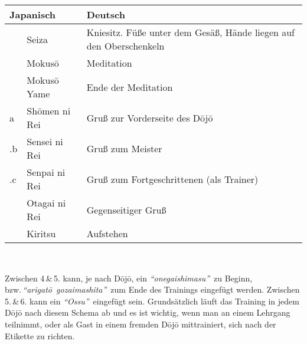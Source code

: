 \setcounter{num}{0}
\setcounter{numz}{0}
\begin{tcolorbox}[colframe=lightgray,colback=white,coltitle=black,title=Allgemeines:\indent Trainingsablauf Begrüßung und Ende]
	\null\vfill\null	
	\begin{tabularx}{\textwidth}{llX}
		\multicolumn{2}{l}{\textbf{Japanisch}} 	& \textbf{Deutsch}\\
		\midrule
		\ctu		& Seiza 				& Kniesitz. Füße unter dem Gesäß, Hände liegen auf den Oberschenkeln\\
		\ctu		& Mokus\={o}			& Meditation\\
		\ctu		& Mokus\={o} Yame		& Ende der Meditation\\
		\ctu a		& Sh\={o}men ni Rei		& Gruß zur Vorderseite des D\={o}j\={o}\\
		\thenum .b	& Sensei ni Rei			& Gruß zum Meister\\
		\thenum .c	& Senpai ni Rei			& Gruß zum Fortgeschrittenen (als Trainer)\\
		\ctu		& Otagai ni Rei			& Gegenseitiger Gruß\\
		\ctu		& Kiritsu				& Aufstehen\\		
		\midrule
	\end{tabularx}\\\null\vfill\null
	\begin{center}
		\parbox{\textwidth-2\tabcolsep}{Zwischen 4\,\&\,5. kann, je nach D\={o}j\={o}, ein \textit{\textquotedblleft onegaishimasu\textquotedblright}~zu Beginn, bzw.\,\textit{\mbox{\textquotedblleft arigat\={o} gozaimashita\textquotedblright}}~zum Ende des Trainings eingefügt werden. Zwischen 5.\,\&\,6. kann ein \textit{\textquotedblleft Ossu\textquotedblright}~eingefügt sein. Grundsätzlich läuft das Training in jedem D\={o}j\={o} nach diesem Schema ab und es ist wichtig, wenn man an einem Lehrgang teilnimmt, oder als Gast in einem fremden D\={o}j\={o} mittrainiert, sich nach der Etikette zu richten.}
	\end{center}\null\vfill\null
\end{tcolorbox}
\clearpage
\pagebreak
\setcounter{num}{10}
\setcounter{numz}{0}	

